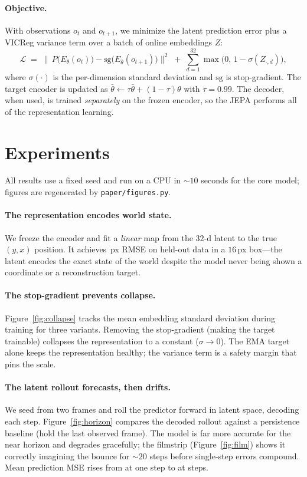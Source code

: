 \documentclass[11pt]{article}
\begin{document}
\paragraph{Objective.} With observations $o_t$ and $o_{t+1}$, we minimize the latent prediction error
plus a VICReg variance term over a batch of online embeddings $Z$:
\begin{equation}
\mathcal{L} \;=\; \big\lVert\, P\!\big(E_\theta(o_t)\big) - \mathrm{sg}\big(E_{\bar\theta}(o_{t+1})\big)\big\rVert^2
\;+\; \sum_{d=1}^{32}\max\!\big(0,\,1-\sigma(Z_{\cdot,d})\big),
\end{equation}
where $\sigma(\cdot)$ is the per-dimension standard deviation and $\mathrm{sg}$ is stop-gradient. The
target encoder is updated as $\bar\theta \leftarrow \tau\bar\theta + (1-\tau)\theta$ with $\tau=0.99$. The
decoder, when used, is trained \emph{separately} on the frozen encoder, so the JEPA performs all of the
representation learning.

\section{Experiments}
\label{sec:exp}
All results use a fixed seed and run on a CPU in ${\sim}10$ seconds for the core model; figures are
regenerated by \texttt{paper/figures.py}.

\paragraph{The representation encodes world state.}
We freeze the encoder and fit a \emph{linear} map from the $32$-d latent to the true $(y,x)$ position.
It achieves \ProbeRMSE\,px RMSE on held-out data in a $16$\,px box---the latent encodes the exact state
of the world despite the model never being shown a coordinate or a reconstruction target.

\paragraph{The stop-gradient prevents collapse.}
Figure~\ref{fig:collapse} tracks the mean embedding standard deviation during training for three
variants. Removing the stop-gradient (making the target trainable) collapses the representation to a
constant ($\sigma\!\to\!0$). The EMA target alone keeps the representation healthy; the variance term is a
safety margin that pins the scale.

\paragraph{The latent rollout forecasts, then drifts.}
We seed from two frames and roll the predictor forward in latent space, decoding each step.
Figure~\ref{fig:horizon} compares the decoded rollout against a persistence baseline (hold the last
observed frame). The model is far more accurate for the near horizon and degrades gracefully; the
filmstrip (Figure~\ref{fig:film}) shows it correctly imagining the bounce for ${\sim}20$ steps before
single-step errors compound. Mean prediction MSE rises from \ForecastStepOne{} at one step to
\ForecastStepK{} at \ForecastHorizon{} steps.
\end{document}
